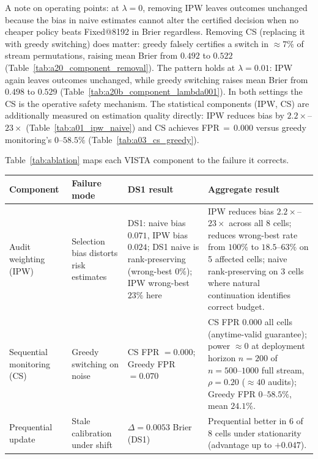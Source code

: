 \documentclass[a4paper,fleqn]{cas-sc}
\theoremstyle{plain}
\theoremstyle{definition}
\theoremstyle{remark}
\begin{document}
A note on operating points: at $\lambda=0$, removing IPW leaves outcomes
unchanged because the bias in naive estimates cannot alter the certified
decision when no cheaper policy beats Fixed@8192 in Brier regardless.
Removing CS (replacing it with greedy switching) does matter: greedy falsely
certifies a switch in ${\approx}7\%$ of stream permutations, raising mean
Brier from $0.492$ to $0.522$ (Table~\ref{tab:a20_component_removal}).
The pattern holds at $\lambda=0.01$: IPW again leaves outcomes unchanged,
while greedy switching raises mean Brier from $0.498$ to $0.529$
(Table~\ref{tab:a20b_component_lambda001}).
In both settings the CS is the operative safety mechanism.
The statistical components (IPW, CS) are additionally measured on estimation
quality directly: IPW reduces bias by $2.2\times$--$23\times$
(Table~\ref{tab:a01_ipw_naive}) and CS achieves FPR\,${=}\,0.000$ versus
greedy monitoring's $0$--$58.5\%$ (Table~\ref{tab:a03_cs_greedy}).

Table~\ref{tab:ablation} maps each VISTA component to the failure it corrects.

\begin{center}
\begin{tabular}{@{}lp{2.3cm}p{2.3cm}p{5.0cm}@{}}
\toprule
Component & Failure mode & DS1 result & Aggregate result \\
\midrule
Audit weighting (IPW) &
  Selection bias distorts risk estimates &
  DS1: naive bias $0.071$, IPW bias $0.024$; DS1 naive is rank-preserving (wrong-best $0\%$); IPW wrong-best $23\%$ here &
  IPW reduces bias $2.2\times$--$23\times$ across all 8 cells; reduces wrong-best rate from $100\%$ to $18.5$--$63\%$ on 5 affected cells; naive rank-preserving on 3 cells where natural continuation identifies correct budget. \\[4pt]
Sequential monitoring (CS) &
  Greedy switching on noise &
  CS FPR $= 0.000$;\, Greedy FPR $= 0.070$ &
  CS FPR $0.000$ all cells (anytime-valid guarantee); power $\approx 0$ at deployment horizon $n{=}200$ of $n{=}500$--$1000$ full stream, $\rho{=}0.20$ (${\approx}40$ audits); Greedy FPR $0$--$58.5\%$, mean $24.1\%$. \\[4pt]
Prequential update &
  Stale calibration under shift &
  $\Delta = 0.0053$ Brier (DS1) &
  Prequential better in 6 of 8 cells under stationarity (advantage up to
  $+0.047$). \\
\bottomrule
\end{tabular}
\end{center}
\begingroup
{}
\label{tab:ablation}
\endgroup
\vspace{\baselineskip}
\end{document}
